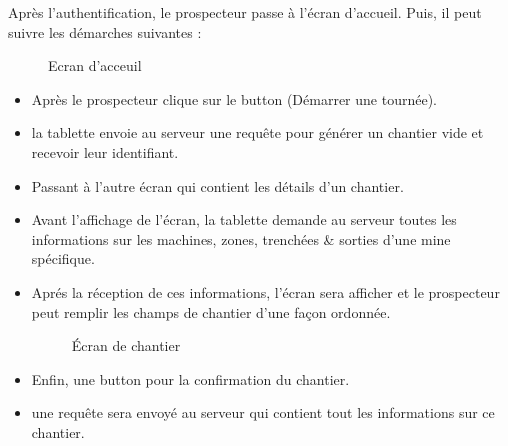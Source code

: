 Apr\`es l'authentification, le prospecteur passe \`a l'\'ecran d'accueil. Puis, il peut suivre les d\'emarches suivantes :
\begin{figure}[H]
	\caption{\label{fig:my-label} Ecran d'acceuil}
\end{figure}
\begin{itemize}
\item Apr\`es le prospecteur clique sur le button (D\'emarrer une tourn\'ee).
\item la tablette envoie au serveur une requ\^ete pour g\'en\'erer un chantier vide et recevoir leur identifiant.
\item Passant \`a l'autre \'ecran qui contient les d\'etails d'un chantier.
\item Avant l'affichage de l'\'ecran, la tablette demande au serveur toutes les informations sur les machines, zones, trench\'ees \& sorties d'une mine sp\'ecifique.
\item Apr\'es la r\'eception de ces informations, l'\'ecran sera afficher et le prospecteur peut remplir les champs de chantier d'une fa\c{c}on ordonn\'ee.
\begin{figure}[H]
	\caption{\label{fig:my-label} \'Ecran de chantier}
\end{figure}
\item Enfin, une button pour la  confirmation du chantier.
\item une requ\^ete sera envoy\'e au serveur qui contient tout les informations sur ce chantier.
\end{itemize} 

